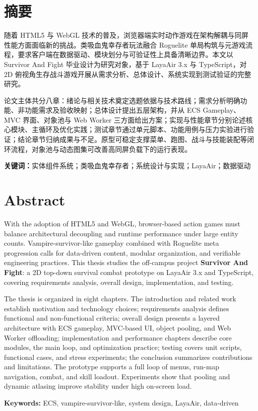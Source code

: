 \documentclass[UTF8,a4paper]{ctexart}
\newcommand{\upcabstracttitle}{\section*{摘\quad 要}}
\newcommand{\upckeywords}[1]{\par\noindent\textbf{关键词：}#1\par}
\newcommand{\upcabstracten}{\section*{Abstract}}
\newcommand{\upckeywordsen}[1]{\par\noindent\textbf{Keywords:} #1\par}
\begin{document}


\upcabstracttitle


随着 HTML5 与 WebGL 技术的普及，浏览器端实时动作游戏在架构解耦与同屏性能方面面临新的挑战。类吸血鬼幸存者玩法融合 Roguelite 单局构筑与元游戏流程，要求客户端在数据驱动、模块划分与可验证性上具备清晰边界。本文以 Survivor And Fight 毕业设计为研究对象，基于 LayaAir 3.x 与 TypeScript，对 2D 俯视角生存战斗游戏开展从需求分析、总体设计、系统实现到测试验证的完整研究。

论文主体共分八章：绪论与相关技术奠定选题依据与技术路线；需求分析明确功能、非功能需求及验收映射；总体设计提出五层架构，并从 ECS Gameplay、MVC 界面、对象池与 Web Worker 三方面给出方案；实现与性能章节分别论述核心模块、主循环及优化实践；测试章节通过单元脚本、功能用例与压力实验进行验证；结论章节归纳成果与不足。原型可稳定支撑菜单、跑图、战斗与技能装配等闭环流程，对象池与动态图集可改善高同屏负载下的运行表现。

\upckeywords{实体组件系统；类吸血鬼幸存者；系统设计与实现；LayaAir；数据驱动}



\upcabstracten


With the adoption of HTML5 and WebGL, browser-based action games must balance architectural decoupling and runtime performance under large entity counts. Vampire-survivor-like gameplay combined with Roguelite meta progression calls for data-driven content, modular organization, and verifiable engineering practices. This thesis studies the off-campus project \textbf{Survivor And Fight}: a 2D top-down survival combat prototype on LayaAir 3.x and TypeScript, covering requirements analysis, overall design, implementation, and testing.

The thesis is organized in eight chapters. The introduction and related work establish motivation and technology choices; requirements analysis defines functional and non-functional criteria; overall design presents a layered architecture with ECS gameplay, MVC-based UI, object pooling, and Web Worker offloading; implementation and performance chapters describe core modules, the main loop, and optimization practice; testing covers unit scripts, functional cases, and stress experiments; the conclusion summarizes contributions and limitations. The prototype supports a full loop of menus, run-map navigation, combat, and skill loadout. Experiments show that pooling and dynamic atlasing improve stability under high on-screen load.

\upckeywordsen{ECS, vampire-survivor-like, system design, LayaAir, data-driven}
\end{document}
